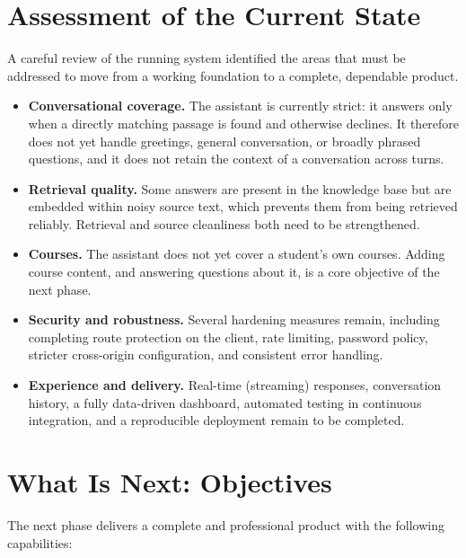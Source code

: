 \documentclass[11pt,a4paper]{article}
\begin{document}
\section{Assessment of the Current State}

A careful review of the running system identified the areas that must be addressed to
move from a working foundation to a complete, dependable product.

\begin{itemize}
  \item \textbf{Conversational coverage.} The assistant is currently strict: it
        answers only when a directly matching passage is found and otherwise declines.
        It therefore does not yet handle greetings, general conversation, or
        broadly phrased questions, and it does not retain the context of a
        conversation across turns.
  \item \textbf{Retrieval quality.} Some answers are present in the knowledge base but
        are embedded within noisy source text, which prevents them from being
        retrieved reliably. Retrieval and source cleanliness both need to be
        strengthened.
  \item \textbf{Courses.} The assistant does not yet cover a student's own courses.
        Adding course content, and answering questions about it, is a core objective
        of the next phase.
  \item \textbf{Security and robustness.} Several hardening measures remain, including
        completing route protection on the client, rate limiting, password policy,
        stricter cross-origin configuration, and consistent error handling.
  \item \textbf{Experience and delivery.} Real-time (streaming) responses,
        conversation history, a fully data-driven dashboard, automated testing in
        continuous integration, and a reproducible deployment remain to be completed.
\end{itemize}

\section{What Is Next: Objectives}

The next phase delivers a complete and professional product with the following
capabilities:
\end{document}
